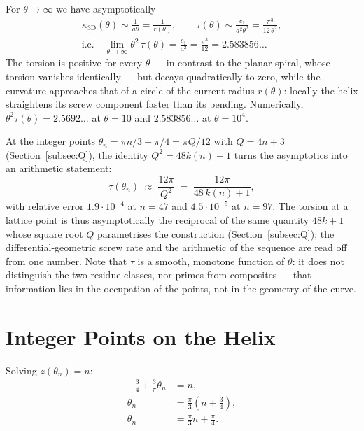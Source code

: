 \begin{remark}\label{rem:asymptotic-torsion}
For $\theta \to \infty$ we have asymptotically
\begin{gather*}
  \kappa_{\mathrm{3D}}(\theta) \sim \frac{1}{a\theta} = \frac{1}{r(\theta)},
  \qquad
  \tau(\theta) \sim \frac{c_1}{a^2\theta^2} = \frac{\pi^3}{12\,\theta^2},\\
  \text{i.e.}\quad
  \lim_{\theta\to\infty} \theta^2\,\tau(\theta) = \frac{c_1}{a^2}
  = \frac{\pi^3}{12} = 2.583856\ldots
\end{gather*}
The torsion is positive for every $\theta$ --- in contrast to the
planar spiral, whose torsion vanishes identically --- but decays
quadratically to zero, while the curvature approaches that of a circle
of the current radius $r(\theta)$: locally the helix straightens its
screw component faster than its bending. Numerically,
$\theta^2\tau(\theta) = 2.5692\ldots$ at $\theta = 10$ and
$2.583856\ldots$ at $\theta = 10^4$.

At the integer points $\theta_n = \pi n/3 + \pi/4 = \pi Q/12$ with
$Q = 4n+3$ (Section~\ref{subsec:Q}), the identity $Q^2 = 48k(n)+1$ turns the
asymptotics into an arithmetic statement:
\begin{equation}\label{eq:torsion_Q}
  \tau(\theta_n) \;\approx\; \frac{12\pi}{Q^2}
  \;=\; \frac{12\pi}{48\,k(n)+1},
\end{equation}
with relative error $1.9 \cdot 10^{-4}$ at $n = 47$ and
$4.5 \cdot 10^{-5}$ at $n = 97$. The torsion at a lattice point is thus
asymptotically the reciprocal of the same quantity $48k+1$ whose square
root $Q$ parametrises the construction
(Section~\ref{subsec:Q}); the differential-geometric
screw rate and the arithmetic of the sequence are read off from one
number. Note that $\tau$ is a smooth, monotone function of $\theta$:
it does not distinguish the two residue classes, nor primes from
composites --- that information lies in the occupation of the points,
not in the geometry of the curve.
\end{remark}

\section{Integer Points on the Helix}

Solving $z(\theta_n) = n$:
\begin{align}
-\frac{3}{4} + \frac{3}{\pi}\theta_n &= n, \\
\theta_n &= \frac{\pi}{3}\left(n + \frac{3}{4}\right), \\
\theta_n &= \frac{\pi}{3}n + \frac{\pi}{4}.
\end{align}


